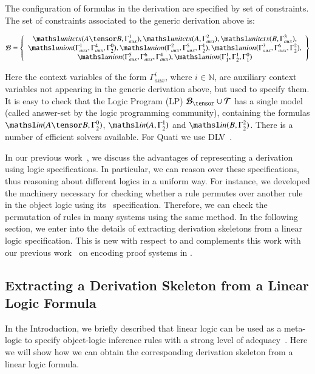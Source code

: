 \documentclass[a4paper,10pt]{article}
\newcommand{\elin}[2]{\ensuremath{{\tsl{unitctx}(\ensuremath{#1}, \ensuremath{#2})}}}
\newcommand{\union}[3]{\ensuremath{{\tsl{union}(\ensuremath{#1},\ensuremath{#2},\ensuremath{ #3})}}}
\newcommand{\In}[2]{\ensuremath{\tsl{in}(\ensuremath{#1},\ensuremath{#2})}}
\begin{document}
The configuration of formulas in the derivation are specified by set of constraints.
The set of constraints associated to the generic derivation above is:
\begin{small}
\[
\Bscr = \left\{
\begin{array}{c}
\elin{A \tensor B}{\Gamma_{aux}^1},
\elin{A}{\Gamma_{aux}^2},
\elin{B}{\Gamma_{aux}^3}, \\
\union{\Gamma_{aux}^1}{\Gamma_{aux}^4}{\Gamma^{0}_{2}},
\union{\Gamma_{aux}^2}{\Gamma_{aux}^5}{\Gamma^{1}_{2}}, 
\union{\Gamma_{aux}^3}{\Gamma_{aux}^6}{\Gamma^{2}_{2}},\\
\union{\Gamma_{aux}^5}{\Gamma_{aux}^6}{\Gamma_{aux}^4},
\union{\Gamma^1_1}{\Gamma^1_2}{\Gamma^0_1}
\end{array}
\right\}
\]
\end{small}%
Here the context variables of the form $\Gamma_{aux}^i$, where $i \in \mathbb{N}$, are 
auxiliary context variables not appearing in the generic derivation above, 
but used to specify them. It is easy to check that the Logic Program (LP) $\Bscr_\tensor \cup \Tscr$
has a single model (called answer-set by the logic programming community), 
containing the formulas $\In{A \tensor B}{\Gamma^{0}_{2}}$,
$\In{A}{\Gamma^{1}_{2}}$ and $\In{B}{\Gamma^{2}_{2}}$. There is a number of efficient 
solvers available. For Quati we use DLV~\cite{leone06tcl}.

In our previous work~\cite{nigam13iclp}, we discuss the advantages of representing 
a derivation using logic specifications. In particular, we can reason over
these specifications, thus reasoning about different logics in a uniform way.
For instance, we developed the machinery necessary for checking whether a rule
permutes over another rule in the object logic using its \sell\ specification.
Therefore, we can check the permutation of rules in many systems using the same
method.
In the following section, we enter into the details of extracting derivation skeletons
from a linear logic specification. This is new with respect to \cite{nigam13iclp} and 
complements this work with our previous work~\cite{nigam.jlc} on encoding proof
systems in \sell. 

\subsection{Extracting a Derivation Skeleton from a Linear Logic Formula}
\label{sec:extract}

In the Introduction, we briefly described that linear logic can be used as a meta-logic 
to specify object-logic inference rules with a strong level of 
adequacy~\cite{nigam10jar}. Here we will show how we can obtain the corresponding
derivation skeleton from a linear logic formula. 
\end{document}
